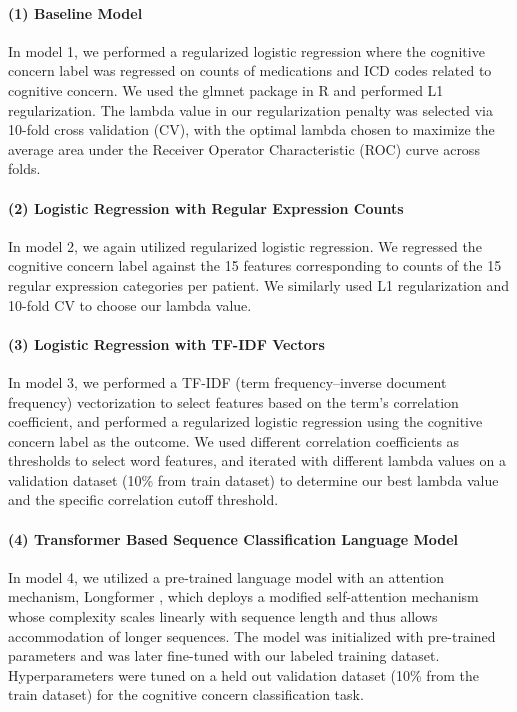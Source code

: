 \documentclass[pmlr,twocolumn]{jmlr} %
\begin{document}
\paragraph{(1) Baseline Model}In model 1, we performed a regularized logistic regression where the cognitive concern label was regressed on counts of medications and ICD codes related to cognitive concern. We used the glmnet package \citep{glmnet} in R and performed L1 regularization. The lambda value in our regularization penalty was selected via 10-fold cross validation (CV), with the optimal lambda chosen to maximize the average area under the Receiver Operator Characteristic (ROC) curve across folds.

\paragraph{(2) Logistic Regression with Regular Expression Counts} In model 2, we again utilized regularized logistic regression. We regressed the cognitive concern label against the 15 features corresponding to counts of the 15 regular expression categories per patient. We similarly used L1 regularization and 10-fold CV to choose our lambda value. 

\paragraph{(3) Logistic Regression with TF-IDF Vectors} In model 3, we performed a TF-IDF (term frequency–inverse document frequency) vectorization to select features based on the term's correlation coefficient, and performed a regularized logistic regression using the cognitive concern label as the outcome. We used different correlation coefficients as thresholds to select word features, and iterated with different lambda values on a validation dataset (10\% from train dataset) to determine our best lambda value and the specific correlation cutoff threshold.  

\paragraph{(4) Transformer Based Sequence Classification Language Model}

In model 4, we utilized a pre-trained language model with an attention mechanism, Longformer \citep{beltagy2020longformer}, which deploys a modified self-attention mechanism whose complexity scales linearly with sequence length and thus allows accommodation of longer sequences. The model was initialized with pre-trained parameters and was later fine-tuned with our labeled training dataset. Hyperparameters were tuned on a held out validation dataset (10\% from the train dataset) for the cognitive concern classification task. 
\end{document}
